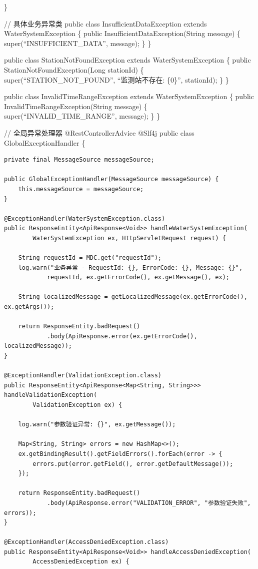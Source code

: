 \}

// 具体业务异常类 public class InsufficientDataException extends WaterSystemException \{ public InsufficientDataException(String message) \{ super(``INSUFFICIENT\_DATA'', message); \} \}

public class StationNotFoundException extends WaterSystemException \{ public StationNotFoundException(Long stationId) \{ super(``STATION\_NOT\_FOUND'', ``监测站不存在: \{0\}'', stationId); \} \}

public class InvalidTimeRangeException extends WaterSystemException \{ public InvalidTimeRangeException(String message) \{ super(``INVALID\_TIME\_RANGE'', message); \} \}

// 全局异常处理器 @RestControllerAdvice @Slf4j public class GlobalExceptionHandler \{

\begin{verbatim}
private final MessageSource messageSource;

public GlobalExceptionHandler(MessageSource messageSource) {
    this.messageSource = messageSource;
}

@ExceptionHandler(WaterSystemException.class)
public ResponseEntity<ApiResponse<Void>> handleWaterSystemException(
        WaterSystemException ex, HttpServletRequest request) {
    
    String requestId = MDC.get("requestId");
    log.warn("业务异常 - RequestId: {}, ErrorCode: {}, Message: {}", 
            requestId, ex.getErrorCode(), ex.getMessage(), ex);
    
    String localizedMessage = getLocalizedMessage(ex.getErrorCode(), ex.getArgs());
    
    return ResponseEntity.badRequest()
            .body(ApiResponse.error(ex.getErrorCode(), localizedMessage));
}

@ExceptionHandler(ValidationException.class)
public ResponseEntity<ApiResponse<Map<String, String>>> handleValidationException(
        ValidationException ex) {
    
    log.warn("参数验证异常: {}", ex.getMessage());
    
    Map<String, String> errors = new HashMap<>();
    ex.getBindingResult().getFieldErrors().forEach(error -> {
        errors.put(error.getField(), error.getDefaultMessage());
    });
    
    return ResponseEntity.badRequest()
            .body(ApiResponse.error("VALIDATION_ERROR", "参数验证失败", errors));
}

@ExceptionHandler(AccessDeniedException.class)
public ResponseEntity<ApiResponse<Void>> handleAccessDeniedException(
        AccessDeniedException ex) {
    

\end{verbatim}
